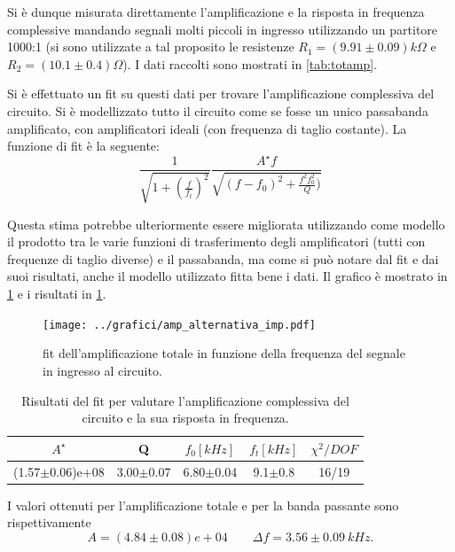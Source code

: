 \documentclass[a4paper,10pt]{article}
\begin{document}
Si è dunque misurata direttamente l'amplificazione e la risposta in frequenza  complessive mandando segnali molti piccoli in ingresso utilizzando un partitore 1000:1 (si sono utilizzate a tal proposito le resistenze $R_1 = (9.91\pm0.09) k\Omega $ e $R_2 = (10.1\pm0.4) \Omega$).
I dati raccolti sono mostrati in \cref{tab:totamp}.

Si è effettuato un fit su questi dati per trovare l'amplificazione complessiva del circuito. Si è modellizzato tutto il circuito come se fosse un unico passabanda amplificato, con amplificatori ideali (con frequenza di taglio costante). La funzione di fit è la seguente:
\begin{equation}
\label{eq:fittot}
\frac{1}{\sqrt{1+(\frac{f}{f_t})^2}} \frac{A^\star f}{\sqrt{(f - f_0)^2+ \frac{f^2 f_0^2}{Q} )}}
\end{equation}

Questa stima potrebbe ulteriormente essere migliorata utilizzando come modello il prodotto tra le varie funzioni di trasferimento degli amplificatori (tutti con frequenze di taglio diverse) e il passabanda, ma come si può notare dal fit e dai suoi risultati, anche il modello utilizzato fitta bene i dati. Il grafico è mostrato in \cref{fig:ampltot} e i risultati in \cref{tab:risult}.

\begin{figure}[H]
	\centering
	\texttt{[image: ../grafici/amp\_alternativa\_imp.pdf]}
	\caption{fit dell'amplificazione totale in funzione della frequenza del segnale in ingresso al circuito.}
	\label{fig:ampltot}
\end{figure}

\begin{table}[H]
	\centering
	\begin{tabular}{c|c|c|c|c}
	$A^\star$ & Q & $f_0[kHz]$ & $f_t[kHz]$ & $\chi^2/DOF$ \\
	\hline
	(1.57$\pm$0.06)e+08 & 3.00$\pm$0.07 & 6.80$\pm$0.04 & 9.1$\pm$0.8 & 16/19 \\
	\end{tabular}
	\caption{Risultati del fit per valutare l'amplificazione complessiva del circuito e la sua risposta in frequenza.}
	\label{tab:risult}
\end{table}

I valori ottenuti per l'amplificazione totale e per la banda passante sono rispettivamente
\[  A = (4.84\pm0.08)e+04 \qquad \Delta f = 3.56\pm0.09~kHz. \]

\end{document}
